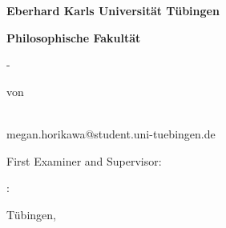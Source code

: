 \begin{titlepage}
{\centering
{\Large \textbf{Eberhard Karls Universität Tübingen}\par}
{\large \textbf{Philosophische Fakultät \fak} \par}
{\large \abschluss-\studiengang\par}
\vspace{1.75cm}
{\Large \textbf{\thesistitle}\par}
\vspace{1.5cm}
{\large \art \par}
\vspace{3cm}
{\large  von\par}
\vspace{1.25cm}
{\authorname \\[3ex]
megan.horikawa@student.uni-tuebingen.de\\[3ex]
\par}}
\vfill
{\noindent First Examiner and Supervisor: \betreuerI 
\par \vspace{0.25cm}
\betreuerIItaetigkeit: \betreuerII
\par \vspace{0.75cm}
Tübingen, \zeitraum} %
\end{titlepage}